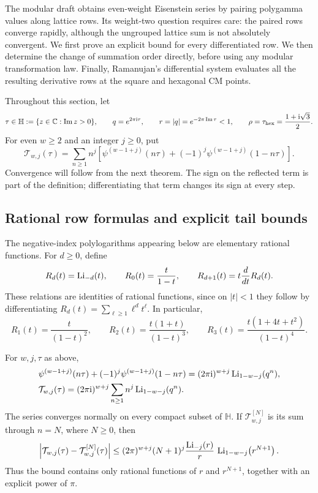 The modular draft obtains even-weight Eisenstein series by pairing
polygamma values along lattice rows. Its weight-two question requires
care: the paired rows converge rapidly, although the ungrouped lattice
sum is not absolutely convergent. We first prove an explicit bound for
every differentiated row. We then determine the change of summation
order directly, before using any modular transformation law. Finally,
Ramanujan's differential system evaluates all the resulting derivative
rows at the square and hexagonal CM points.

Throughout this section, let
\[
\tau\in\mathbb H:=\{z\in\mathbb C:\operatorname{Im} z>0\},\qquad
q=e^{2\pi\mathrm{i}\tau},\qquad r=|q|=e^{-2\pi\operatorname{Im}\tau}<1,
\qquad \rho=\tau_{\mathrm{hex}}=\frac{1+\mathrm{i}\sqrt3}{2}.
\]
For even \(w\ge2\) and an integer \(j\ge0\), put
\begin{equation}
\mathcal T_{w,j}(\tau)
=\sum_{n\ge1}n^j\left[
 \psi^{(w-1+j)}(n\tau)
 +(-1)^j\psi^{(w-1+j)}(1-n\tau)\right].
\label{modular:eq:modular-T-definition}
\end{equation}
Convergence will follow from the next theorem. The sign on the reflected
term is part of the definition; differentiating that term changes its
sign at every step.

\subsection{Rational row formulas and explicit tail bounds}

The negative-index polylogarithms appearing below are elementary
rational functions. For \(d\ge0\), define
\[
R_d(t)=\operatorname{Li}_{-d}(t),\qquad
R_0(t)=\frac{t}{1-t},\qquad
R_{d+1}(t)=t\frac{d}{dt}R_d(t).
\]
These relations are identities of rational functions, since on
\(|t|<1\) they follow by differentiating
\(R_d(t)=\sum_{\ell\ge1}\ell^d t^\ell\). In particular,
\[
R_1(t)=\frac{t}{(1-t)^2},\qquad
R_2(t)=\frac{t(1+t)}{(1-t)^3},\qquad
R_3(t)=\frac{t(1+4t+t^2)}{(1-t)^4}.
\]

\begin{theorem}
\label{modular:thm:modular-rows-tail}
For \(w,j,\tau\) as above,
\begin{align}
&\psi^{(w-1+j)}(n\tau)
 +(-1)^j\psi^{(w-1+j)}(1-n\tau)
 =(2\pi\mathrm{i})^{w+j}\operatorname{Li}_{1-w-j}(q^n),
\label{modular:eq:modular-single-row}\\
&\mathcal T_{w,j}(\tau)
 =(2\pi\mathrm{i})^{w+j}\sum_{n\ge1}n^j\operatorname{Li}_{1-w-j}(q^n).
\label{modular:eq:modular-rational-rows}
\end{align}
The series converges normally on every compact subset of \(\mathbb H\).
If \(\mathcal T_{w,j}^{[N]}\) is its sum through \(n=N\), where
\(N\ge0\), then
\begin{equation}
\left|\mathcal T_{w,j}(\tau)-\mathcal T_{w,j}^{[N]}(\tau)\right|
\le (2\pi)^{w+j}(N+1)^j
 \frac{\operatorname{Li}_{-j}(r)}{r}\,
 \operatorname{Li}_{1-w-j}\!\left(r^{N+1}\right).
\label{modular:eq:modular-tail-bound}
\end{equation}
Thus the bound contains only rational functions of \(r\) and
\(r^{N+1}\), together with an explicit power of \(\pi\).
\end{theorem}

